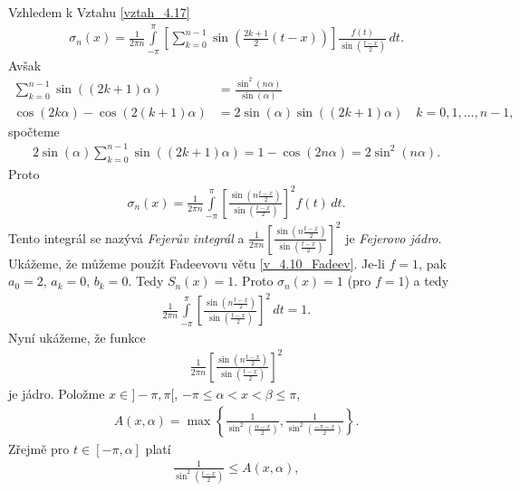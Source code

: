 Vzhledem k Vztahu \eqref{vztah_4.17}
\begin{align*}
\sigma_n (x) = \frac{1}{2 \pi n} \int \limits_{-\pi}^\pi \left[ \sum \limits _{k=0}^{n-1} \sin \left( \frac{2k+1}{2}(t-x) \right) \right] \frac{f(t)}{\sin \left( \frac{t-x}{2} \right) }\, dt.
\end{align*}
Avšak
\begin{align*}
\sum \limits _{k=0}^{n-1} \sin ( (2k + 1) \alpha ) &= \frac{\sin^2 (n \alpha)}{\sin (\alpha)}\\
\cos (2k \alpha) - \cos (2(k+1) \alpha)&= 2\sin (\alpha) \sin ((2k + 1) \alpha) \quad k=0,1, \ldots, n-1,
\end{align*}
spočteme
\begin{align*}
2 \sin (\alpha) \sum \limits _{k=0}^{n-1} \sin ((2k+1)\alpha) = 1 - \cos (2n \alpha) = 2 \sin^2 (n \alpha).
\end{align*}
Proto
\begin{align*}
\sigma_n (x) = \frac{1}{2 \pi n} \int \limits_{-\pi}^\pi \left[ \frac{\sin \left( n \frac{t-x}{2} \right)}{\sin \left( \frac{t-x}{2} \right)} \right]^2 f(t) \, dt.
\end{align*}
Tento integrál se nazývá \textit{Fejerův integrál} a $\frac{1}{2\pi n} \left[ \frac{\sin \left( n \frac{t-x}{2} \right)}{\sin \left( \frac{t-x}{2} \right)} \right]^2$ je \textit{Fejerovo jádro}. Ukážeme, že můžeme použít Fadeevovu větu \ref{v_4.10_Fadeev}. Je-li $f=1$, pak $a_0 = 2$, $a_k = 0$, $b_k = 0$. Tedy $S_n (x) = 1$. Proto $\sigma_n (x) = 1$ (pro $f = 1$) a tedy
\begin{align}\label{vztah_4.18}
\frac{1}{2 \pi n} \int \limits_{-\pi}^\pi \left[ \frac{\sin \left( n \frac{t-x}{2} \right)}{\sin \left( \frac{t-x}{2} \right)} \right]^2 \, dt = 1.
\end{align}
Nyní ukážeme, že funkce
\begin{align*}
\frac{1}{2 \pi n} \left[ \frac{\sin \left( n \frac{t-x}{2} \right)}{\sin \left( \frac{t-x}{2} \right)} \right]^2
\end{align*}
je jádro.
Položme $x \in ]-\pi, \pi[$, $-\pi \leq \alpha < x < \beta \leq \pi$,
\begin{align*}
A (x,\alpha) = \max \left\{ \frac{1}{\sin^2 \left( \frac{\alpha - x}{2} \right)}, \frac{1}{\sin^2 \left( \frac{-\pi - x}{2} \right)} \right\}.
\end{align*}
Zřejmě pro $t \in [-\pi, \alpha]$ platí
\begin{align*}
\frac{1}{\sin^2 \left( \frac{t - x}{2} \right)} \leq A(x, \alpha),
\end{align*}
